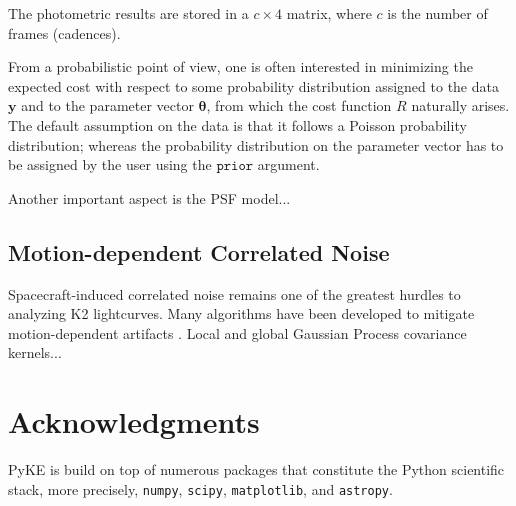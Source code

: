 \documentclass{article}
\begin{document}
The photometric results are stored in a $c \times 4$ matrix, where $c$ is the
number of frames (cadences).

From a probabilistic point of view, one is often interested in minimizing the
expected cost with respect to some probability distribution assigned to the data
$\bm{y}$ and to the parameter vector $\bm{\theta}$, from which the cost function
$R$ naturally arises. The default assumption on the data is that it follows
a Poisson probability distribution; whereas the probability distribution on the
parameter vector has to be assigned by the user using the $\texttt{prior}$
argument.

Another important aspect is the PSF model...

\subsection{Motion-dependent Correlated Noise}

Spacecraft-induced correlated noise remains one of the greatest hurdles to analyzing K2 lightcurves.  Many algorithms have been developed to mitigate motion-dependent artifacts \cite{vanderburg14}.  Local and global Gaussian Process covariance kernels...

\label{subsection:motion}

\section{Acknowledgments}
PyKE is build on top of numerous packages that constitute the Python scientific
stack, more precisely, \texttt{numpy}, \texttt{scipy}, \texttt{matplotlib}, and
\texttt{astropy}.

\clearpage

%
%
\end{document}
